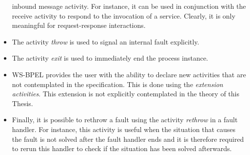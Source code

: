 \begin{itemize}
inbound message activity. For instance, it can be used in conjunction with the receive activity
to respond to the invocation of a service. Clearly, it is only meaningful
for request-response interactions.
\item The activity \emph{throw} is used to signal an internal fault explicitly.
\item The activity \emph{exit} is used to immediately end the process instance.
\item WS-BPEL provides the user with the ability to declare new activities that are
not contemplated in the specification. This is done using the \emph{extension activities}. This
extension is not explicitly contemplated in the theory of this Thesis.
\item Finally, it is possible to rethrow a fault using the activity \emph{rethrow} in a fault handler.
For instance, this activity is useful when the situation that causes the fault is not solved after
the fault handler ends and it is therefore required to rerun this handler to check if the
situation has been solved afterwards.
\end{itemize}  


